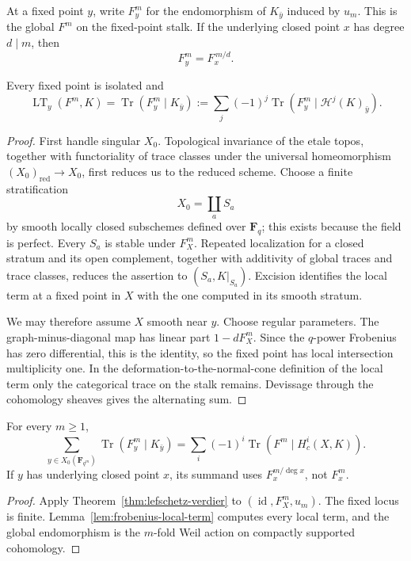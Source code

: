 At a fixed point \(y\), write \(F_y^m\) for the endomorphism of \(K_{\bar y}\)
induced by \(u_m\).  This is the global \(F^m\) on the fixed-point stalk.  If
the underlying closed point \(x\) has degree \(d\mid m\), then
\[
 F_y^m=F_x^{\,m/d}.
\]

\begin{lemma}
\label{lem:frobenius-local-term}
Every fixed point is isolated and
\[
 \operatorname{LT}_y(F^m,K)
 =\operatorname{Tr}(F_y^m\mid K_{\bar y})
 :=\sum_j(-1)^j
 \operatorname{Tr}(F_y^m\mid\mathcal H^j(K)_{\bar y}).
\]
\end{lemma}

\begin{proof}
First handle singular \(X_0\).  Topological invariance of the etale topos,
together with functoriality of trace classes under the universal homeomorphism
\((X_0)_{\mathrm{red}}\to X_0\), first reduces us to the reduced scheme.
Choose a finite stratification
\[
 X_0=\coprod_a S_a
\]
by smooth locally closed subschemes defined over \(\mathbf F_q\); this exists
because the field is perfect.  Every \(S_a\) is stable under \(F_X^m\).
Repeated localization for a closed stratum and its open complement, together
with additivity of global traces and trace classes, reduces the assertion to
\((S_a,K|_{S_a})\).  Excision identifies the local term at a fixed point in
\(X\) with the one computed in its smooth stratum.

We may therefore assume \(X\) smooth near \(y\).  Choose regular parameters.
The graph-minus-diagonal map has linear part \(1-dF_X^m\).  Since the
\(q\)-power Frobenius has zero differential, this is the identity, so the
fixed point has local intersection multiplicity one.  In the
deformation-to-the-normal-cone definition of the local term only the
categorical trace on the stalk remains.  Devissage through the cohomology
sheaves gives the alternating sum.
\end{proof}

\begin{theorem}
\label{thm:GL-trace}
For every \(m\geq1\),
\[
 \boxed{\;
 \sum_{y\in X_0(\mathbf F_{q^m})}
 \operatorname{Tr}(F_y^m\mid K_{\bar y})
 =
 \sum_i(-1)^i
 \operatorname{Tr}(F^m\mid H_c^i(X,K)).
 \;}
\]
If \(y\) has underlying closed point \(x\), its summand uses
\(F_x^{m/\deg x}\), not \(F_x^m\).
\end{theorem}

\begin{proof}
Apply Theorem~\ref{thm:lefschetz-verdier} to
\((\operatorname{id},F_X^m,u_m)\).  The fixed locus is finite.
Lemma~\ref{lem:frobenius-local-term} computes every local term, and the global
endomorphism is the \(m\)-fold Weil action on compactly supported cohomology.
\end{proof}

